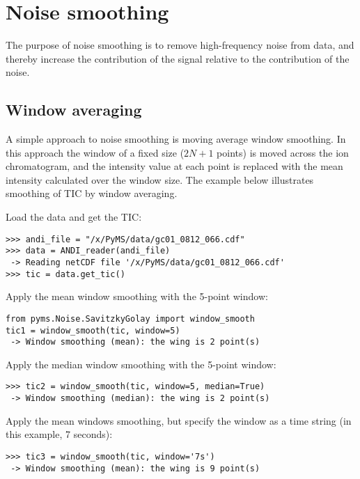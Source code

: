 \section{Noise smoothing}

The purpose of noise smoothing is to remove high-frequency noise from
data, and thereby increase the contribution of the signal relative to
the contribution of the noise.

\subsection{Window averaging}


A simple approach to noise smoothing is moving average window smoothing.
In this approach the window of a fixed size ($2N+1$ points) is moved
across the ion chromatogram, and the intensity value at each point is
replaced with the mean intensity calculated over the window size.
The example below illustrates smoothing of TIC by window averaging.

Load the data and get the TIC:

\begin{verbatim}
>>> andi_file = "/x/PyMS/data/gc01_0812_066.cdf"
>>> data = ANDI_reader(andi_file)
 -> Reading netCDF file '/x/PyMS/data/gc01_0812_066.cdf'
>>> tic = data.get_tic()
\end{verbatim}

Apply the mean window smoothing with the 5-point window:

\begin{verbatim}
from pyms.Noise.SavitzkyGolay import window_smooth
tic1 = window_smooth(tic, window=5)
 -> Window smoothing (mean): the wing is 2 point(s)
\end{verbatim}

Apply the median window smoothing with the 5-point window:

\begin{verbatim}
>>> tic2 = window_smooth(tic, window=5, median=True)
 -> Window smoothing (median): the wing is 2 point(s)
\end{verbatim}

Apply the mean windows smoothing, but specify the window as
a time string (in this example, 7 seconds):

\begin{verbatim}
>>> tic3 = window_smooth(tic, window='7s')
 -> Window smoothing (mean): the wing is 9 point(s)
\end{verbatim}

